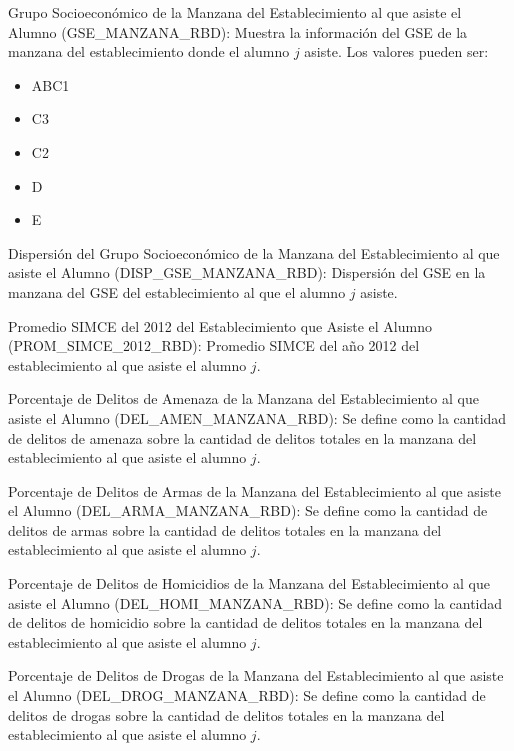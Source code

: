 \begin{longdescription}
\begin{longdescription}
        \item[Grupo Socioeconómico de la Manzana del Establecimiento al que asiste el Alumno](GSE\_MANZANA\_RBD): Muestra la información del GSE de la manzana del establecimiento donde el alumno $j$ asiste.
        Los valores pueden ser:
        \begin{itemize}
        \item ABC1
        \item C3
        \item C2
        \item D
        \item E
        \end{itemize}
        
        \item[Dispersión del Grupo Socioeconómico de la Manzana del Establecimiento al que asiste el Alumno](DISP\_GSE\_MANZANA\_RBD):
        Dispersión del GSE en la manzana del GSE del establecimiento al que el alumno $j$ asiste.
        
        \item[Promedio SIMCE del 2012 del Establecimiento que Asiste el Alumno](PROM\_SIMCE\_2012\_RBD):
        Promedio SIMCE del año 2012 del establecimiento al que asiste el alumno $j$.
        
        \item[Porcentaje de Delitos de Amenaza de la Manzana del Establecimiento al que asiste el Alumno](DEL\_AMEN\_MANZANA\_RBD): Se define como la cantidad de delitos de amenaza sobre la cantidad de delitos totales en la manzana del establecimiento al que asiste el alumno $j$.
        
        \item[Porcentaje de Delitos de Armas de la Manzana del Establecimiento al que asiste el Alumno](DEL\_ARMA\_MANZANA\_RBD): Se define como la cantidad de delitos de armas sobre la cantidad de delitos totales en la manzana del establecimiento al que asiste el alumno $j$.
        
        \item[Porcentaje de Delitos de Homicidios de la Manzana del Establecimiento al que asiste el Alumno](DEL\_HOMI\_MANZANA\_RBD): Se define como la cantidad de delitos de homicidio sobre la cantidad de delitos totales en la manzana del establecimiento al que asiste el alumno $j$.
        
        \item[Porcentaje de Delitos de Drogas de la Manzana del Establecimiento al que asiste el Alumno](DEL\_DROG\_MANZANA\_RBD):
        Se define como la cantidad de delitos de drogas sobre la cantidad de delitos totales en la manzana del establecimiento al que asiste el alumno $j$.
        

\end{longdescription}
\end{longdescription}
